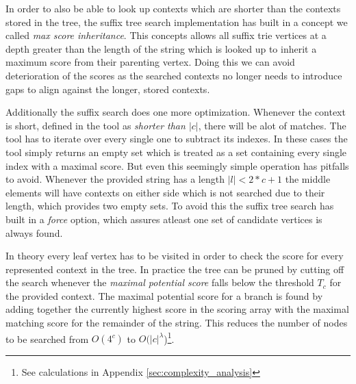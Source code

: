 \documentclass[thesis.tex]{subfiles}
\begin{document}
In order to also be able to look up contexts which are shorter than the contexts stored in the tree, the suffix tree search implementation has built in a concept we called \textit{max score inheritance}. This concepts allows all suffix trie vertices at a depth greater than the length of the string which is looked up to inherit a maximum score from their parenting vertex. Doing this we can avoid deterioration of the scores as the searched contexts no longer needs to introduce gaps to align against the longer, stored contexts.\\
\par\noindent
Additionally the suffix search does one more optimization. Whenever the context is short, defined in the tool as \textit{shorter than $|c|$}, there will be alot of matches. The tool has to iterate over every single one to subtract its indexes. In these cases the tool simply returns an empty set which is treated as a set containing every single index with a maximal score. But even this seemingly simple operation has pitfalls to avoid. Whenever the provided string has a length $|l| < 2*c+1$ the middle elements will have contexts on either side which is not searched due to their length, which provides two empty sets. To avoid this the suffix tree search has built in a \textit{force} option, which assures atleast one set of candidate vertices is always found.\\
\par\noindent
In theory every leaf vertex has to be visited in order to check the score for every represented context in the tree. In practice the tree can be pruned by cutting off the search whenever the \textit{maximal potential score} falls below the threshold $T_c$ for the provided context. The maximal potential score for a branch is found by adding together the currently highest score in the scoring array with the maximal matching score for the remainder of the string. This reduces the number of nodes to be searched from $O(4^c)$ to $O(|c|^{\lambda}$)\footnote{See calculations in Appendix \ref{sec:complexity_analysis}}.\\
\end{document}
